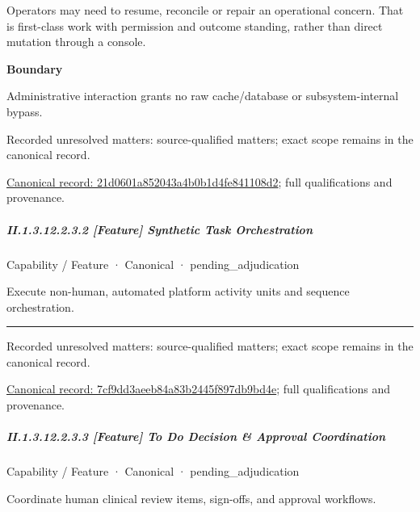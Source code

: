 Operators may need to resume, reconcile or repair an operational concern. That is first-class work with permission and outcome standing, rather than direct mutation through a console.



\textbf{Boundary}



Administrative interaction grants no raw cache/database or subsystem-internal bypass.


{\small Recorded unresolved matters: source-qualified matters; exact scope remains in the canonical record.}\par
{\footnotesize \href{../../../../continuum/strategy/capability/feature/21d0601a852043a4b0b1d4fe841108d2.md}{Canonical record: 21d0601a852043a4b0b1d4fe841108d2}; full qualifications and provenance.}\par
\subparagraph*{II.1.3.12.2.3.2 [Feature] Synthetic Task Orchestration}
\label{navigation:II.1.3.12.2.3.2}

\label{element:7cf9dd3aeeb84a83b2445f897db9bd4e}
{\small Capability / Feature · Canonical · pending\_adjudication}\par

Execute non-human, automated platform activity units and sequence orchestration.



\medskip\hrule\medskip

{\small Recorded unresolved matters: source-qualified matters; exact scope remains in the canonical record.}\par
{\footnotesize \href{../../../../continuum/strategy/capability/feature/7cf9dd3aeeb84a83b2445f897db9bd4e.md}{Canonical record: 7cf9dd3aeeb84a83b2445f897db9bd4e}; full qualifications and provenance.}\par
\subparagraph*{II.1.3.12.2.3.3 [Feature] To Do Decision \& Approval Coordination}
\label{navigation:II.1.3.12.2.3.3}

\label{element:377a40e8f2d64840a10dd55f87a9d005}
{\small Capability / Feature · Canonical · pending\_adjudication}\par

Coordinate human clinical review items, sign-offs, and approval workflows.



